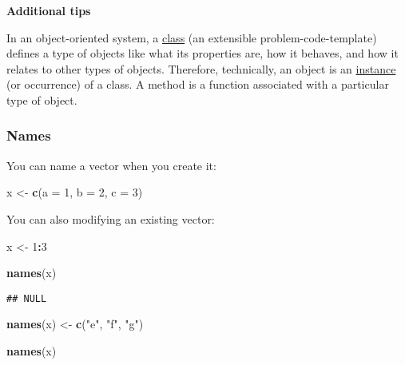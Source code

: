 \documentclass[
]{book}
\newenvironment{Shaded}{\begin{snugshade}}{\end{snugshade}}
\newcommand{\DataTypeTok}[1]{\textcolor[rgb]{0.13,0.29,0.53}{#1}}
\newcommand{\DecValTok}[1]{\textcolor[rgb]{0.00,0.00,0.81}{#1}}
\newcommand{\KeywordTok}[1]{\textcolor[rgb]{0.13,0.29,0.53}{\textbf{#1}}}
\newcommand{\NormalTok}[1]{#1}
\newcommand{\OperatorTok}[1]{\textcolor[rgb]{0.81,0.36,0.00}{\textbf{#1}}}
\newcommand{\StringTok}[1]{\textcolor[rgb]{0.31,0.60,0.02}{#1}}
\begin{document}
\textbf{Additional tips}

In an object-oriented system, a \href{https://www.google.com/search?q=what+is+class+programming\&oq=what+is+class+programming\&aqs=chrome.0.0l6.3543j0j4\&sourceid=chrome\&ie=UTF-8}{class} (an extensible problem-code-template) defines a type of objects like what its properties are, how it behaves, and how it relates to other types of objects. Therefore, technically, an object is an \href{https://en.wikipedia.org/wiki/Instance_(computer_science)}{instance} (or occurrence) of a class. A method is a function associated with a particular type of object.

\hypertarget{names}{%
\subsubsection{Names}\label{names}}

You can name a vector when you create it:

\begin{Shaded}
\begin{Highlighting}[]
\NormalTok{x \textless{}{-}}\StringTok{ }\KeywordTok{c}\NormalTok{(}\DataTypeTok{a =} \DecValTok{1}\NormalTok{, }\DataTypeTok{b =} \DecValTok{2}\NormalTok{, }\DataTypeTok{c =} \DecValTok{3}\NormalTok{)}
\end{Highlighting}
\end{Shaded}

You can also modifying an existing vector:

\begin{Shaded}
\begin{Highlighting}[]
\NormalTok{x \textless{}{-}}\StringTok{ }\DecValTok{1}\OperatorTok{:}\DecValTok{3}

\KeywordTok{names}\NormalTok{(x)}
\end{Highlighting}
\end{Shaded}

\begin{verbatim}
## NULL
\end{verbatim}

\begin{Shaded}
\begin{Highlighting}[]
\KeywordTok{names}\NormalTok{(x) \textless{}{-}}\StringTok{ }\KeywordTok{c}\NormalTok{(}\StringTok{"e"}\NormalTok{, }\StringTok{"f"}\NormalTok{, }\StringTok{"g"}\NormalTok{)}

\KeywordTok{names}\NormalTok{(x)}
\end{Highlighting}
\end{Shaded}
\end{document}
